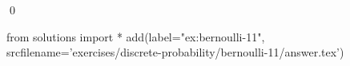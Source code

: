 
\begin{ex} 
  \label{ex:bernoulli-11}
  
  \qed
\end{ex} 
\begin{python0}
from solutions import *
add(label="ex:bernoulli-11",
    srcfilename='exercises/discrete-probability/bernoulli-11/answer.tex') 
\end{python0}
